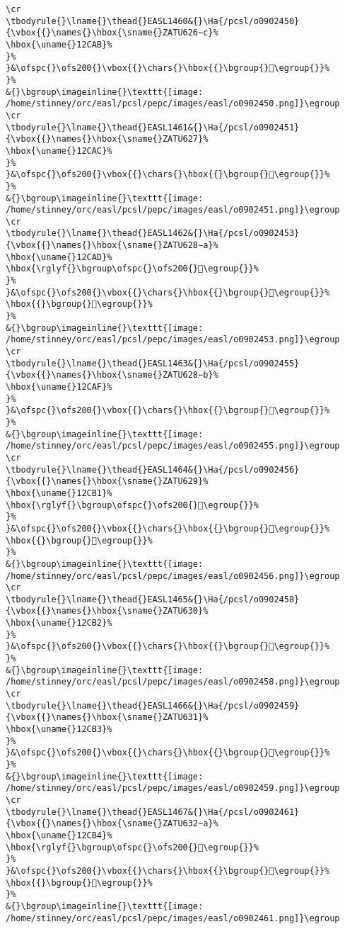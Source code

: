 \begin{verbatim}
\cr
\tbodyrule{}\lname{}\thead{}EASL1460&{}\Ha{/pcsl/o0902450}{\vbox{{}\names{}\hbox{\sname{}ZATU626∼c}%
\hbox{\uname{}12CAB}%
}%
}&\ofspc{}\ofs200{}\vbox{{}\chars{}\hbox{{}\bgroup{}𒲫\egroup{}}%
}%
&{}\bgroup\imageinline{}\texttt{[image: /home/stinney/orc/easl/pcsl/pepc/images/easl/o0902450.png]}\egroup
\cr
\tbodyrule{}\lname{}\thead{}EASL1461&{}\Ha{/pcsl/o0902451}{\vbox{{}\names{}\hbox{\sname{}ZATU627}%
\hbox{\uname{}12CAC}%
}%
}&\ofspc{}\ofs200{}\vbox{{}\chars{}\hbox{{}\bgroup{}𒲬\egroup{}}%
}%
&{}\bgroup\imageinline{}\texttt{[image: /home/stinney/orc/easl/pcsl/pepc/images/easl/o0902451.png]}\egroup
\cr
\tbodyrule{}\lname{}\thead{}EASL1462&{}\Ha{/pcsl/o0902453}{\vbox{{}\names{}\hbox{\sname{}ZATU628∼a}%
\hbox{\uname{}12CAD}%
\hbox{\rglyf{}\bgroup\ofspc{}\ofs200{}𒲭\egroup{}}%
}%
}&\ofspc{}\ofs200{}\vbox{{}\chars{}\hbox{{}\bgroup{}𒲭\egroup{}}%
\hbox{{}\bgroup{}𒲮\egroup{}}%
}%
&{}\bgroup\imageinline{}\texttt{[image: /home/stinney/orc/easl/pcsl/pepc/images/easl/o0902453.png]}\egroup
\cr
\tbodyrule{}\lname{}\thead{}EASL1463&{}\Ha{/pcsl/o0902455}{\vbox{{}\names{}\hbox{\sname{}ZATU628∼b}%
\hbox{\uname{}12CAF}%
}%
}&\ofspc{}\ofs200{}\vbox{{}\chars{}\hbox{{}\bgroup{}𒲯\egroup{}}%
}%
&{}\bgroup\imageinline{}\texttt{[image: /home/stinney/orc/easl/pcsl/pepc/images/easl/o0902455.png]}\egroup
\cr
\tbodyrule{}\lname{}\thead{}EASL1464&{}\Ha{/pcsl/o0902456}{\vbox{{}\names{}\hbox{\sname{}ZATU629}%
\hbox{\uname{}12CB1}%
\hbox{\rglyf{}\bgroup\ofspc{}\ofs200{}𒲱\egroup{}}%
}%
}&\ofspc{}\ofs200{}\vbox{{}\chars{}\hbox{{}\bgroup{}𒲰\egroup{}}%
\hbox{{}\bgroup{}𒲱\egroup{}}%
}%
&{}\bgroup\imageinline{}\texttt{[image: /home/stinney/orc/easl/pcsl/pepc/images/easl/o0902456.png]}\egroup
\cr
\tbodyrule{}\lname{}\thead{}EASL1465&{}\Ha{/pcsl/o0902458}{\vbox{{}\names{}\hbox{\sname{}ZATU630}%
\hbox{\uname{}12CB2}%
}%
}&\ofspc{}\ofs200{}\vbox{{}\chars{}\hbox{{}\bgroup{}𒲲\egroup{}}%
}%
&{}\bgroup\imageinline{}\texttt{[image: /home/stinney/orc/easl/pcsl/pepc/images/easl/o0902458.png]}\egroup
\cr
\tbodyrule{}\lname{}\thead{}EASL1466&{}\Ha{/pcsl/o0902459}{\vbox{{}\names{}\hbox{\sname{}ZATU631}%
\hbox{\uname{}12CB3}%
}%
}&\ofspc{}\ofs200{}\vbox{{}\chars{}\hbox{{}\bgroup{}𒲳\egroup{}}%
}%
&{}\bgroup\imageinline{}\texttt{[image: /home/stinney/orc/easl/pcsl/pepc/images/easl/o0902459.png]}\egroup
\cr
\tbodyrule{}\lname{}\thead{}EASL1467&{}\Ha{/pcsl/o0902461}{\vbox{{}\names{}\hbox{\sname{}ZATU632∼a}%
\hbox{\uname{}12CB4}%
\hbox{\rglyf{}\bgroup\ofspc{}\ofs200{}𒲴\egroup{}}%
}%
}&\ofspc{}\ofs200{}\vbox{{}\chars{}\hbox{{}\bgroup{}𒲴\egroup{}}%
\hbox{{}\bgroup{}𒲵\egroup{}}%
}%
&{}\bgroup\imageinline{}\texttt{[image: /home/stinney/orc/easl/pcsl/pepc/images/easl/o0902461.png]}\egroup

\end{verbatim}

